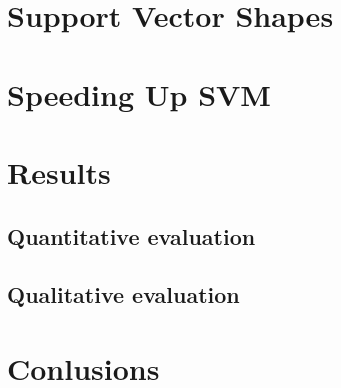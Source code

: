 \documentclass[12pt]{article}
\begin{document}
\maketitle



\section{Support Vector Shapes}

\section{Speeding Up SVM}

\section{Results}

\subsection{Quantitative evaluation}

\subsection{Qualitative evaluation}

\section{Conlusions}

\nocite{*}


\end{document}
